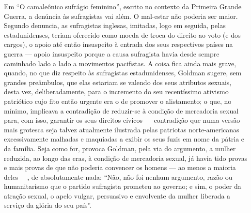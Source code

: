 Em ``O camaleônico sufrágio feminino'', escrito no contexto da Primeira
Grande Guerra, a denúncia às sufragistas vai além. O mal-estar não
poderia ser maior. Segundo denuncia, as sufragistas inglesas, imitadas,
logo em seguida, pelas estadunidenses, teriam oferecido como moeda de
troca do direito ao voto (e dos cargos), o apoio até então insuspeito à
entrada dos seus respectivos países na guerra --- apoio insuspeito porque
a causa sufragista havia desde sempre caminhado lado a lado a movimentos
pacifistas. A coisa fica ainda mais grave, quando, no que diz respeito
às sufragistas estadunidenses, Goldman sugere, sem grandes preâmbulos,
que elas estariam se valendo dos seus atributos sexuais, desta vez,
deliberadamente, para o incremento do seu recentíssimo ativismo
patriótico cujo fito então urgente era o de promover o alistamento; o
que, no mínimo, implicava a contradição de reduzir-se à condição de
mercadoria sexual para, com isso, garantir os seus direitos cívicos ---
contradição que numa versão mais grotesca seja talvez atualmente
ilustrada pelas patriotas norte-americanas excessivamente malhadas e
maquiadas a exibir os seus fuzis em nome da pátria e da família. Seja
como for, provoca Goldman, pela via do argumento, a mulher reduzida, ao
longo das eras, à condição de mercadoria sexual, já havia tido provas e
mais provas de que não poderia convencer os homens --- ao menos a maioria
deles ---, de absolutamente nada: ``Não, não foi nenhum argumento, razão
ou humanitarismo que o partido sufragista prometeu ao governo; e sim, o
poder da atração sexual, o apelo vulgar, persuasivo e envolvente da
mulher liberada a serviço da glória do seu país''.

